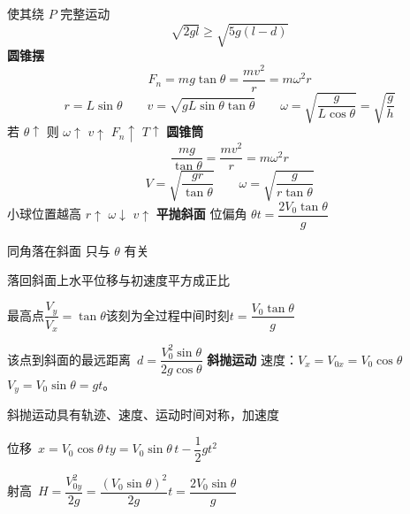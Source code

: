 使其绕 $P$ 完整运动
\[
\sqrt{2gl}\ge\sqrt{5g(l-d)}
\]
\textbf{圆锥摆}
\[
F_n=mg\tan\theta=\frac{mv^2}{r}=m\omega^2r
\]
\[
r=L\sin\theta\qquad v=\sqrt{gL\sin\theta\tan\theta}\qquad \omega=\sqrt{\frac{g}{L\cos\theta}}=\sqrt{\frac{g}{h}}
\]
若 $\theta\uparrow$ 则 $\omega\uparrow$ $v\uparrow$ $F_n\uparrow$ $T\uparrow$
\textbf{圆锥筒}
\[
\frac{mg}{\tan\theta}=\frac{mv^2}{r}=m\omega^2r
\]
\[
V=\sqrt{\frac{gr}{\tan\theta}}\qquad \omega=\sqrt{\frac{g}{r\tan\theta}}
\]
小球位置越高 $r\uparrow$ $\omega\downarrow$ $v\uparrow$
\textbf{平抛斜面}
位偏角 $\theta$\quad $t=\dfrac{2V_0\tan\theta}{g}$

同角落在斜面 只与 $\theta$ 有关

落回斜面上水平位移与初速度平方成正比

最高点\quad $\dfrac{V_y}{V_x}=\tan\theta$\quad 该刻为全过程中间时刻\quad $t=\dfrac{V_0\tan\theta}{g}$

该点到斜面的最远距离\ $d=\dfrac{V_0^2\sin\theta}{2g\cos\theta}$ %
\textbf{斜抛运动}
速度：$V_x=V_{0x}=V_0\cos\theta$\qquad $V_y=V_0\sin\theta=gt$。 %

斜抛运动具有轨迹、速度、运动时间对称，加速度

位移\ $x=V_0\cos\theta\,t$\qquad $y=V_0\sin\theta\,t-\dfrac12gt^2$

射高\ $H=\dfrac{V_{0y}^2}{2g}=\dfrac{(V_0\sin\theta)^2}{2g}$\qquad $t=\dfrac{2V_0\sin\theta}{g}$

